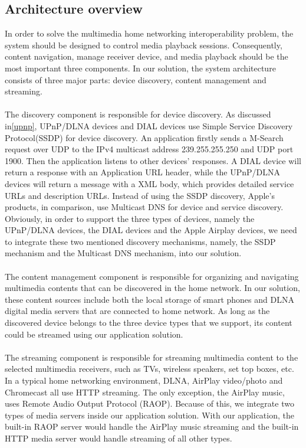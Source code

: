 \subsection{Architecture overview}
In order to solve the multimedia home networking interoperability problem, the system should be designed to control media playback sessions. Consequently, content navigation, manage receiver device, and media playback should be the most important three components. In our solution, the system architecture consists of three major parts: device discovery, content management and streaming.\\
\\
The discovery component is responsible for device discovery. As discussed
in\ref{upnp}, UPnP/DLNA devices and DIAL devices use Simple Service Discovery Protocol(SSDP) for device discovery. An application firstly sends a M-Search request over UDP to the IPv4 multicast address 239.255.255.250 and UDP port 1900. Then the application listens to other devices' responses. A DIAL device will return a response with an Application URL header, while the UPnP/DLNA devices will return a message with a XML body, which provides detailed service URLs and description URLs. Instead of using the SSDP discovery, Apple's products, in comparison, use Multicast DNS for device and service discovery. Obviously, in order to support the three types of devices, namely the UPnP/DLNA devices, the DIAL devices and the Apple Airplay devices, we need to integrate these two mentioned discovery mechanisms, namely, the SSDP mechanism and the Multicast DNS mechanism, into our solution.\\
\\
The content management component is responsible for organizing and
 navigating multimedia contents that can be discovered in the home network. In our solution, these content sources include both the local storage of smart phones and DLNA digital media servers that are connected to home network. As long as the discovered device belongs to the three device types that we support, its content could be streamed using our application solution.\\
\\
The streaming component is responsible for streaming multimedia content to the selected multimedia receivers, such as TVs, wireless speakers, set top boxes, etc. In a typical home networking environment, DLNA, AirPlay video/photo and Chromecast all use HTTP streaming. The only exception, the AirPlay music, uses Remote Audio Output Protocol (RAOP). Because of this, we integrate two types of media servers inside our application solution. With our application, the built-in RAOP server would handle the AirPlay music streaming and the built-in HTTP media server would handle streaming of all other types.

